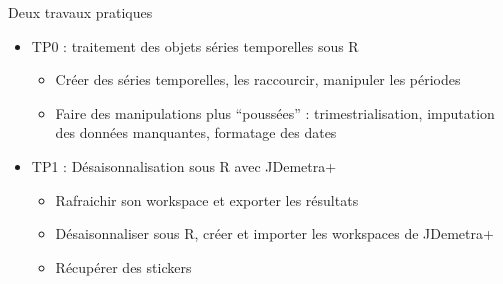 \documentclass[10pt,xcolor=table,color={dvipsnames,usenames},ignorenonframetext,usepdftitle=false,french]{beamer}
\providecommand{\tightlist}{%
  \setlength{\parskip}{0pt}
  }
\begin{document}
\begin{frame}{Deux travaux pratiques}
\protect\hypertarget{deux-travaux-pratiques}{}

\begin{itemize}
\item
  TP0 : traitement des objets séries temporelles sous R

  \begin{itemize}
  \item
    Créer des séries temporelles, les raccourcir, manipuler les périodes
  \item
    Faire des manipulations plus ``poussées'' : trimestrialisation,
    imputation des données manquantes, formatage des dates
  \end{itemize}
\item
  TP1 : Désaisonnalisation sous R avec JDemetra+

  \begin{itemize}
  \item
    Rafraichir son workspace et exporter les résultats
  \item
    Désaisonnaliser sous R, créer et importer les workspaces de
    JDemetra+
  \end{itemize}

  \pause

  \begin{itemize}
  \tightlist
  \item
    Récupérer des stickers
  \end{itemize}
\end{itemize}

\end{frame}
\end{document}
